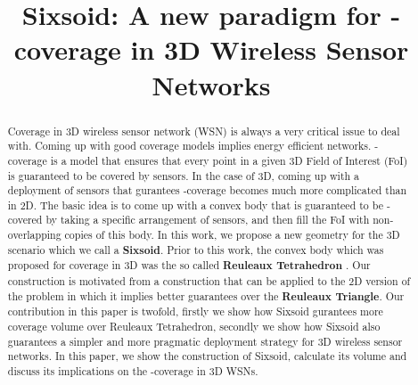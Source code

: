 \documentclass[conference]{IEEEtran}
\begin{document}
\title{Sixsoid: A new paradigm for -coverage in 3D Wireless Sensor Networks}


\author{
\and
{}
}












\maketitle


\begin{abstract}
Coverage in 3D wireless sensor network (WSN) is always a very critical issue to deal with. Coming up with good coverage models implies energy efficient networks. -coverage is a model that ensures that every point in a given 3D Field of Interest (FoI) is guaranteed to be covered by  sensors. In the case of 3D, coming up with a deployment of sensors that gurantees -coverage becomes much more complicated than in 2D. The basic idea is to come up with a convex body that is guaranteed to be -covered by taking a specific arrangement of sensors, and then fill the FoI with non-overlapping copies of this body.  
In this work, we propose a new geometry for the 3D scenario which we call a \textbf{Sixsoid}. Prior to this work, the convex body  which
was proposed for coverage in 3D was the so called \textbf{Reuleaux Tetrahedron} \cite{A, AD1}. Our construction is motivated from a construction that can be applied to the 2D version of  the problem \cite{MS} in which it implies better guarantees over the \textbf{Reuleaux Triangle}.  Our contribution in this paper is twofold, firstly we show how Sixsoid gurantees more coverage volume over Reuleaux Tetrahedron, secondly we show how Sixsoid also guarantees a simpler and more pragmatic deployment strategy for 3D wireless sensor networks. In this paper, we show the construction of Sixsoid, calculate its volume and discuss its implications on the -coverage in 3D WSNs.
\end{abstract}
\end{document}
